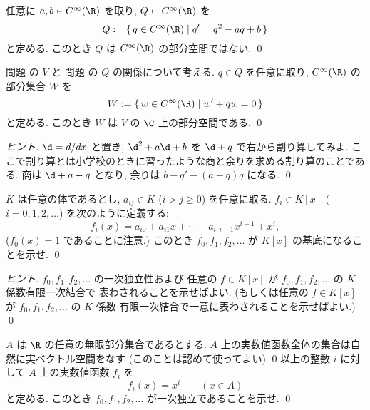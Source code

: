 \documentclass[12pt,twoside]{jarticle}
\begin{document}
\begin{question}[Riccati型微分方程式, 5点]
  \label{q:Riccati1}
  任意に $a,b\in C^\infty(\R)$ を取り, $Q \subset C^\infty(\R)$ を
  \begin{equation*}
    Q := \{\, q\in C^\infty(\R) \mid q' = q^2 - aq + b \,\}
  \end{equation*}
  と定める. このとき $Q$ は $C^\infty(\R)$ の部分空間ではない.
  \qed
\end{question}

\begin{question}[10点]
  \label{q:Riccati2}
  問題  の $V$ と
  問題  の $Q$ の関係について考える.
  $q\in Q$ を任意に取り, $C^\infty(\R)$ の部分集合 $W$ を
  \begin{equation*}
    W := \{\, w\in C^\infty(\R) \mid w' + qw = 0 \,\}
  \end{equation*}
  と定める. このとき $W$ は $V$ の $\C$ 上の部分空間である.
  \qed
\end{question}

\begin{proof}[ヒント]
  $\d=d/dx$ と置き, $\d^2+a\d+b$ を $\d+q$ で右から割り算してみよ.
  ここで割り算とは小学校のときに習ったような商と余りを求める割り算のことである.
  商は $\d+a-q$ となり, 余りは $b-q'-(a-q)q$ になる.
  \qed
\end{proof}

\begin{question}[10点]
  $K$ は任意の体であるとし, $a_{ij}\in K$ ($i>j\ge 0$) を任意に取る.
  $f_i\in K[x]$  ($i=0,1,2,\ldots$) を次のように定義する:
  \begin{equation*}
    f_i(x) = a_{i0} + a_{i1}x + \cdots + a_{i,i-1}x^{i-1} + x^i,
  \end{equation*}
  ($f_0(x)=1$ であることに注意.)
  このとき $f_0,f_1,f_2,\ldots$ が $K[x]$ の基底になることを示せ.
  \qed
\end{question}

\begin{proof}[ヒント]
  $f_0,f_1,f_2,\ldots$ の一次独立性および
  任意の $f\in K[x]$ が $f_0,f_1,f_2,\ldots$ の $K$ 係数有限一次結合で
  表わされることを示せばよい. 
  (もしくは任意の $f\in K[x]$ が $f_0,f_1,f_2,\ldots$ の $K$ 係数
  有限一次結合で一意に表わされることを示せばよい.)
  \qed
\end{proof}

\begin{question}[10点]
  \label{q:lin-indep-x^k}
  $A$ は $\R$ の任意の無限部分集合であるとする.
  $A$ 上の実数値函数全体の集合は自然に実ベクトル空間をなす
  (このことは認めて使ってよい).
  $0$ 以上の整数 $i$ に対して $A$ 上の実数値函数 $f_i$ を
  \begin{equation*}
    f_i(x) = x^i \qquad (x\in A)
  \end{equation*}
  と定める. このとき $f_0,f_1,f_2,\ldots$ が一次独立であることを示せ.
  \qed
\end{question}
\end{document}
